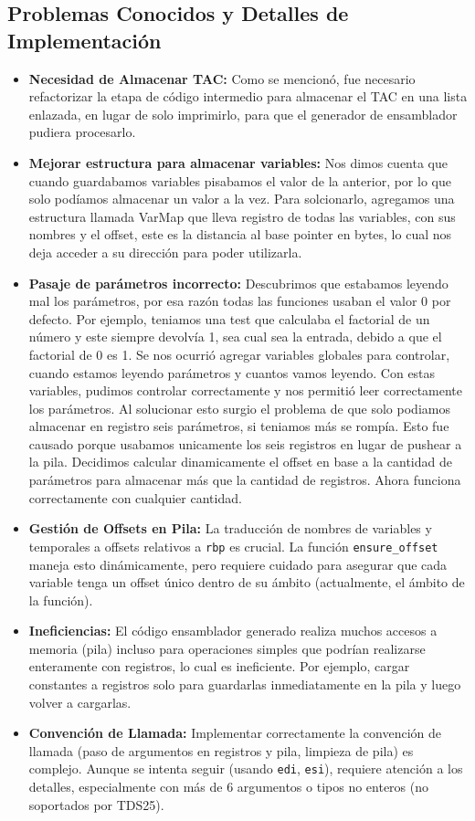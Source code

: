 \documentclass[12pt,a4paper]{article}
\begin{document}
\subsection{Problemas Conocidos y Detalles de Implementación}
\begin{itemize}
    \item \textbf{Necesidad de Almacenar TAC:} Como se mencionó, fue necesario refactorizar la etapa de código intermedio para almacenar el TAC en una lista enlazada, en lugar de solo imprimirlo, para que el generador de ensamblador pudiera procesarlo.
    \item \textbf{Mejorar estructura para almacenar variables:} Nos dimos cuenta que cuando guardabamos variables pisabamos el valor de la anterior, por lo que solo podíamos almacenar un valor a la vez. Para solcionarlo, agregamos una estructura llamada VarMap que lleva registro de todas las variables, con sus nombres y el offset, este es la distancia al base pointer en bytes, lo cual nos deja acceder a su dirección para poder utilizarla.
    \item \textbf{Pasaje de parámetros incorrecto:} Descubrimos que estabamos leyendo mal los parámetros, por esa razón todas las funciones usaban el valor 0 por defecto. Por ejemplo, teniamos una test que calculaba el factorial de un número y este siempre devolvía 1, sea cual sea la entrada, debido a que el factorial de 0 es 1. 
    Se nos ocurrió agregar variables globales para controlar, cuando estamos leyendo parámetros y cuantos vamos leyendo. Con estas variables, pudimos controlar correctamente y nos permitió leer correctamente los parámetros. Al solucionar esto surgio el problema de que solo podiamos almacenar en registro seis parámetros, si teniamos más se rompía. Esto fue causado porque usabamos unicamente los seis registros en lugar de pushear a la pila. Decidimos calcular dinamicamente el offset en base a la cantidad de parámetros para almacenar más que la cantidad de registros. Ahora funciona correctamente con cualquier cantidad.
    \item \textbf{Gestión de Offsets en Pila:} La traducción de nombres de variables y temporales a offsets relativos a \texttt{rbp} es crucial. La función \texttt{ensure\_offset} maneja esto dinámicamente, pero requiere cuidado para asegurar que cada variable tenga un offset único dentro de su ámbito (actualmente, el ámbito de la función).
    \item \textbf{Ineficiencias:} El código ensamblador generado realiza muchos accesos a memoria (pila) incluso para operaciones simples que podrían realizarse enteramente con registros, lo cual es ineficiente. Por ejemplo, cargar constantes a registros solo para guardarlas inmediatamente en la pila y luego volver a cargarlas.
    \item \textbf{Convención de Llamada:} Implementar correctamente la convención de llamada (paso de argumentos en registros y pila, limpieza de pila) es complejo. Aunque se intenta seguir (usando \texttt{edi}, \texttt{esi}), requiere atención a los detalles, especialmente con más de 6 argumentos o tipos no enteros (no soportados por TDS25).
\end{itemize}
\end{document}
